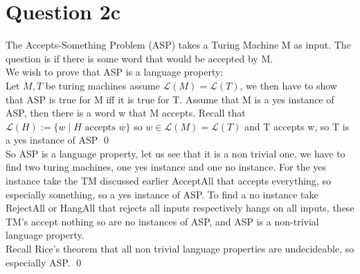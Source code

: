 \documentclass{article}
\theoremstyle{remark}
\numberwithin{equation}{section}
\begin{document}
\section{Question 2c}
The Accepts-Something Problem (ASP) takes a Turing Machine M as input. The question is if there is some word that would be accepted by M.\\
We wish to prove that ASP is a language property:\\
Let $M,T$ be turing machines assume $\mathcal{L}(M) = \mathcal{L}(T)$, we then have to show that ASP is true for M iff it is true for T. Assume that M is a yes instance of ASP, then there is a word w that M accepts. Recall that $\mathcal{L}(H) := \{w \mid H\text{ accepts }w\}$ so $w\in\mathcal{L}(M)=\mathcal{L}(T)$ and T accepts w, so T is a yes instance of ASP \qed\\
So ASP is a language property, let us see that it is a non trivial one, we have to find two turing machines, one yes instance and one no instance. For the yes instance take the TM discussed earlier AcceptAll that accepts everything, so especially something, so a yes instance of ASP. To find a no instance take RejectAll or HangAll that rejects all inputs respectively hangs on all inputs, these TM's accept nothing so are no instances of ASP, and ASP is a non-trivial language property.
\\Recall Rice's theorem that all non trivial language properties are undecideable, so especially ASP. \qed
\end{document}
